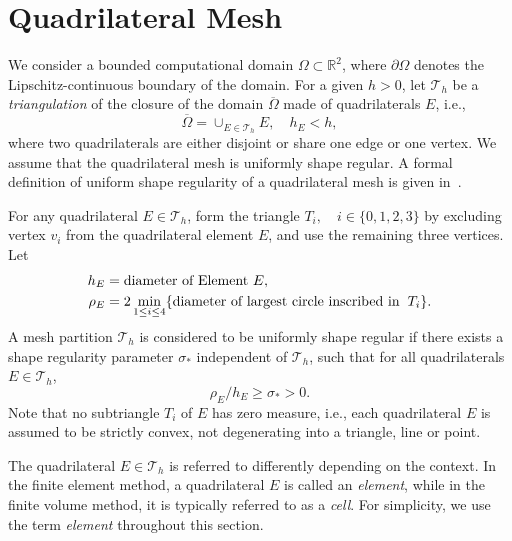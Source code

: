 \section{Quadrilateral Mesh}
\label{sec:mesh}
We consider a bounded computational domain $\Omega \subset \mathbb{R}^2$, where 
$\partial \Omega$ denotes the 
Lipschitz-continuous boundary of the domain.
For a given $h>0$, let $\mathcal{T}_h$ be a \textit{triangulation} of the closure
of the domain $\overline{\Omega}$ made of quadrilaterals $E$, i.e.,
\begin{equation}
		  \overline{\Omega} = \cup_{E\in\mathcal{T}_h} E, \quad h_E < h,
\end{equation}
where two quadrilaterals are either disjoint or share one edge or one vertex.
We assume that the quadrilateral mesh is uniformly shape regular. 
A formal definition of uniform shape regularity of a 
quadrilateral mesh is given in~\cite{FinElemMethNavierStokes}.
\begin{defn}\label{def:shaperegularity}
For any quadrilateral $E \in \mathcal{T}_h$, 
form the triangle $T_i, \quad i \in \{0,1,2,3\}$ by excluding 
vertex $v_i$ from the quadrilateral element $E$, and use the remaining three vertices.
Let
\begin{equation}\label{eq:shaperegularity}
\begin{aligned}
		  h_E &= \text{diameter of Element $E$},\\
\rho_E &= 2 \min_{1\leq i\leq4} \{ \text{diameter of largest circle inscribed in} \hspace{0.2cm} T_i  \}.
\end{aligned}
\end{equation}
A mesh partition $\mathcal{T}_h$ is considered to be uniformly shape regular 
if there exists a shape regularity parameter $\sigma_*$
independent of $\mathcal{T}_h$,
such that for all quadrilaterals $E \in \mathcal{T}_h$,
\begin{equation}\label{eq:regularityineq}
\rho_E/h_E \geq \sigma_* >0.
\end{equation}
Note that no subtriangle $T_i$ of $E$ has zero measure, i.e., each quadrilateral $E$ is assumed
to be strictly convex, not degenerating into a triangle, line or point.
		  \end{defn}

The quadrilateral $E \in \mathcal{T}_h$ is referred to differently depending on the context.
In the finite element method, a quadrilateral $E$ is called an \textit{element}, while
in the finite volume method, it is typically referred to as a \textit{cell}.
For simplicity, we use the term \textit{element} throughout this section.

